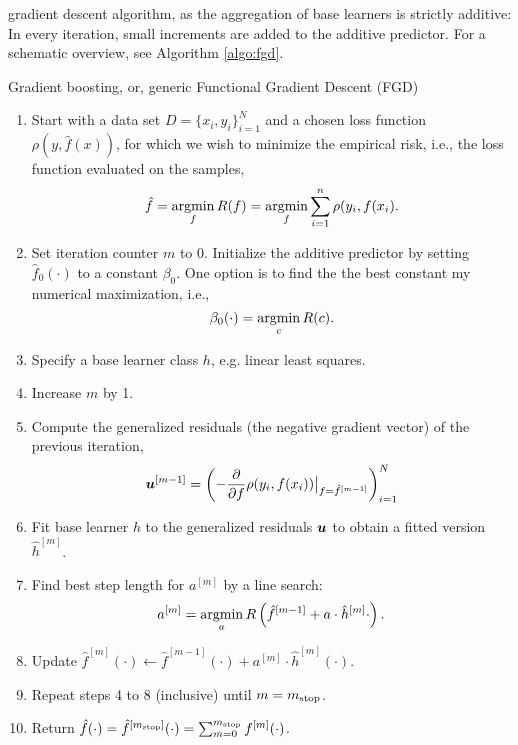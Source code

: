 gradient descent algorithm, as the aggregation of base learners is strictly additive:
In every iteration, small increments are added to the additive predictor.
For a schematic overview, see Algorithm \ref{algo:fgd}.
\begin{algorithm}
\caption{Gradient boosting, or, generic Functional Gradient Descent (FGD)}
\label{algo:fgd}
\begin{enumerate}
    \item Start with a data set $D=\{x_i, y_i\}_{i=1}^N$ and a chosen loss function $\rho(y,\hat{f}(x))$, for which we wish to
        minimize the empirical risk, i.e., the loss function evaluated on the samples,
        \begin{equation}
            \hat{f}=\operatorname*{argmin}_{f}R(f)=\operatorname*{argmin}_{f}\sum_{i=1}^n\rho(y_{i},f(x_{i}).
        \end{equation}
    \item Set iteration counter $m$ to 0. Initialize the additive predictor by setting $\hat{f}_0(\cdot)$ to a constant $\beta_0$. One option is to find the the best constant my numerical maximization, i.e.,
        \begin{equation}
            \beta_0(\cdot)=\operatorname*{argmin}_c R(c).
        \end{equation}
    \item Specify a base learner class $h$, e.g. linear least squares.
    \item Increase $m$ by 1.
    \item Compute the generalized residuals (the negative gradient vector) of the previous iteration,
        \begin{equation}
            \bm{u}^{[m-1]}=\left(-\frac{\partial}{\partial f}\rho(y_i, f(x_i))\big\rvert_{f=\hat{f}^{[m-1]}}\right)_{i=1}^N
        \end{equation}
    \item Fit base learner $h$ to the generalized residuals $\bm{u}$ to obtain a fitted version $\hat{h}^{[m]}$.
    \item Find best step length for $a^{[m]}$ by a line search:
        \begin{equation*}
            a^{[m]}=\operatorname*{argmin}_{a}R\left(\hat{f}^{[m-1]}+a\cdot\hat{h}^{[m]}{\cdot}\right).
        \end{equation*}
    \item Update $\hat{f}^{[m]}(\cdot)\gets \hat{f}^{[m-1]}(\cdot)+a^{[m]}\cdot \hat{h}^{[m]}(\cdot)$.
    \item Repeat steps 4 to 8 (inclusive) until $m=m_{\text{stop}}$.
    \item Return $\hat{f}(\cdot)=\hat{f}^{[m_{\text{stop}}]}(\cdot)=\sum_{m=0}^{m_{\text{stop}}}f^{[m]}(\cdot)$.
\end{enumerate}
\end{algorithm}

